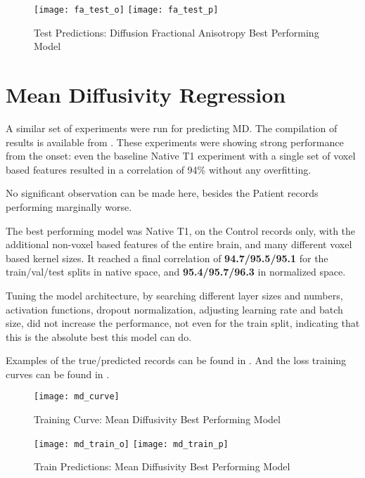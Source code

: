 \begin{figure}[H]
\centering
\texttt{[image: fa\_test\_o]}
\texttt{[image: fa\_test\_p]}
\caption{Test Predictions: Diffusion Fractional Anisotropy Best Performing Model}
\label{fig:pred-tes-fa}
\end{figure}

\section{Mean Diffusivity Regression}

A similar set of experiments were run for predicting \ac{MD}. The compilation of results is available from  . These experiments were showing strong performance from the onset: even the baseline Native T1 experiment with a single set of voxel based features resulted in a correlation of 94\% without any overfitting.\par
No significant observation can be made here, besides the Patient records performing marginally worse.\par
The best performing model was Native T1, on the Control records only, with the additional non-voxel based features of the entire brain, and many different voxel based kernel sizes. It reached a final correlation of \textbf{94.7/95.5/95.1} for the train/val/test splits in native space, and \textbf{95.4/95.7/96.3} in normalized space.\par
Tuning the model architecture, by searching different layer sizes and numbers, activation functions, dropout normalization, adjusting learning rate and batch size, did not increase the performance, not even for the train split, indicating that this is the absolute best this model can do.\par
Examples of the true/predicted records can be found in  . And the loss training curves can be found in .

\begin{figure}[H]
\centering
\texttt{[image: md\_curve]}
\caption{Training Curve: Mean Diffusivity Best Performing Model}
\label{fig:curve-md}
\end{figure}

\begin{figure}[H]
\centering
\texttt{[image: md\_train\_o]}
\texttt{[image: md\_train\_p]}
\caption{Train Predictions: Mean Diffusivity Best Performing Model}
\label{fig:pred-tra-md}
\end{figure}

